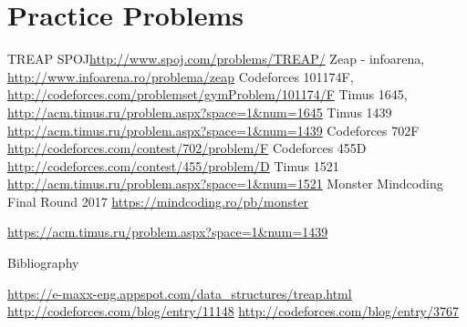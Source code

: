 \documentclass[10pt]{beamer}
\begin{document}
\section{Practice Problems}


\begin{frame}[allowframebreaks]

\begin{thebibliography}{9}

TREAP SPOJ\url{http://www.spoj.com/problems/TREAP/}
Zeap - infoarena, \url{http://www.infoarena.ro/problema/zeap}
Codeforces 101174F, \url{http://codeforces.com/problemset/gymProblem/101174/F}
Timus 1645, \url{http://acm.timus.ru/problem.aspx?space=1&num=1645}
Timus 1439 \url{http://acm.timus.ru/problem.aspx?space=1&num=1439}
Codeforces 702F \url{http://codeforces.com/contest/702/problem/F}
Codeforces 455D \url{http://codeforces.com/contest/455/problem/D}
Timus 1521 \url{http://acm.timus.ru/problem.aspx?space=1&num=1521}
Monster Mindcoding Final Round 2017 \url{https://mindcoding.ro/pb/monster}


\url{https://acm.timus.ru/problem.aspx?space=1&num=1439} %

\end{thebibliography}

\begin{block}{Bibliography}
\begin{thebibliography}{9}

\url{https://e-maxx-eng.appspot.com/data_structures/treap.html}
\url{http://codeforces.com/blog/entry/11148}
\url{http://codeforces.com/blog/entry/3767}


\end{thebibliography}
\end{block}
\end{frame}


\end{document}
